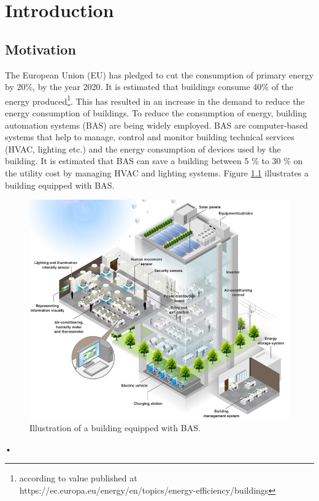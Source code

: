 \chapter{Introduction}
\label{chp:introduction}
\section{Motivation}
\label{sec:motivation}
The European Union (EU) has pledged to cut the consumption of primary energy by 20\%, by the year 2020.  It is estimated that buildings consume 40\% of the energy produced\footnote{according to value published at https://ec.europa.eu/energy/en/topics/energy-efficiency/buildings }.  This has resulted in an increase in the demand to reduce the energy consumption of buildings. To reduce the consumption of energy, building automation systems (BAS) are being widely employed. BAS are computer-based systems that help to manage, control and monitor building technical services (HVAC, lighting etc.) and the energy consumption of devices used by the building. It is estimated that BAS can save a building between 5 \% to 30 \% on the utility cost by managing HVAC and lighting systems\cite{bas}. Figure \ref{fig:BAS} illustrates a building equipped with BAS.

\begin{figure}[!ht]
\includegraphics[scale=0.50]{./pics/bms.jpg}
\caption{Illustration of a building equipped with BAS.}
\label{fig:BAS}

\end{figure}•

